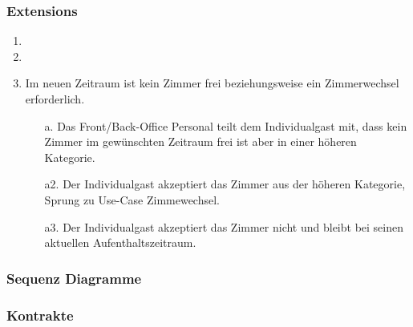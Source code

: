 \documentclass[./detailed_overview_usecases.tex]{subfiles}
\begin{document}
    \subsubsection*{Extensions}
    \begin{enumerate}
        \item 
		\item 
		\item Im neuen Zeitraum ist kein Zimmer frei beziehungsweise ein Zimmerwechsel erforderlich.
        \begin{itemize}
                       \item[a.] Das Front/Back-Office Personal teilt dem Individualgast mit, dass kein Zimmer im gewünschten Zeitraum frei ist aber in einer höheren Kategorie.
					   \item[a2.] Der Individualgast akzeptiert das Zimmer aus der höheren Kategorie, Sprung zu Use-Case Zimmewechsel.
					   \item[a3.] Der Individualgast akzeptiert das Zimmer nicht und bleibt bei seinen aktuellen Aufenthaltszeitraum.
                       
        \end{itemize}
    \end{enumerate}

    \subsubsection{Sequenz Diagramme}
    \subsubsection{Kontrakte}
\end{document}
